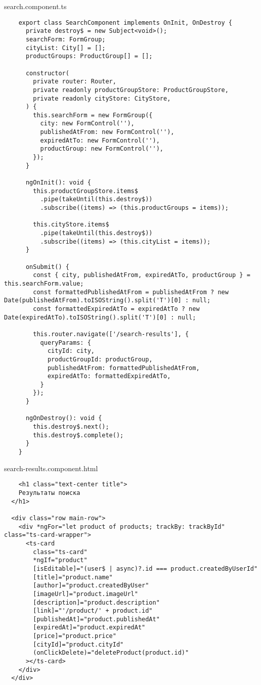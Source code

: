 search.component.ts
\begin{lstlisting}
    export class SearchComponent implements OnInit, OnDestroy {
      private destroy$ = new Subject<void>();
      searchForm: FormGroup;
      cityList: City[] = [];
      productGroups: ProductGroup[] = [];
    
      constructor(
        private router: Router,
        private readonly productGroupStore: ProductGroupStore,
        private readonly cityStore: CityStore,
      ) {
        this.searchForm = new FormGroup({
          city: new FormControl(''),
          publishedAtFrom: new FormControl(''),
          expiredAtTo: new FormControl(''),
          productGroup: new FormControl(''),
        });
      }
    
      ngOnInit(): void {
        this.productGroupStore.items$
          .pipe(takeUntil(this.destroy$))
          .subscribe((items) => (this.productGroups = items));
    
        this.cityStore.items$
          .pipe(takeUntil(this.destroy$))
          .subscribe((items) => (this.cityList = items));
      }
    
      onSubmit() {
        const { city, publishedAtFrom, expiredAtTo, productGroup } = this.searchForm.value;
        const formattedPublishedAtFrom = publishedAtFrom ? new Date(publishedAtFrom).toISOString().split('T')[0] : null;
        const formattedExpiredAtTo = expiredAtTo ? new Date(expiredAtTo).toISOString().split('T')[0] : null;
    
        this.router.navigate(['/search-results'], {
          queryParams: {
            cityId: city,
            productGroupId: productGroup,
            publishedAtFrom: formattedPublishedAtFrom,
            expiredAtTo: formattedExpiredAtTo,
          }
        });
      }
    
      ngOnDestroy(): void {
        this.destroy$.next();
        this.destroy$.complete();
      }
    }    
\end{lstlisting}

search-results.component.html
\begin{lstlisting}
    <h1 class="text-center title">
    Результаты поиска
  </h1>
  
  <div class="row main-row">
    <div *ngFor="let product of products; trackBy: trackById" class="ts-card-wrapper">
      <ts-card
        class="ts-card"
        *ngIf="product"
        [isEditable]="(user$ | async)?.id === product.createdByUserId"
        [title]="product.name"
        [author]="product.createdByUser"
        [imageUrl]="product.imageUrl"
        [description]="product.description"
        [link]="'/product/' + product.id"
        [publishedAt]="product.publishedAt"
        [expiredAt]="product.expiredAt"
        [price]="product.price"
        [cityId]="product.cityId"
        (onClickDelete)="deleteProduct(product.id)"
      ></ts-card>
    </div>
  </div>  
\end{lstlisting}


